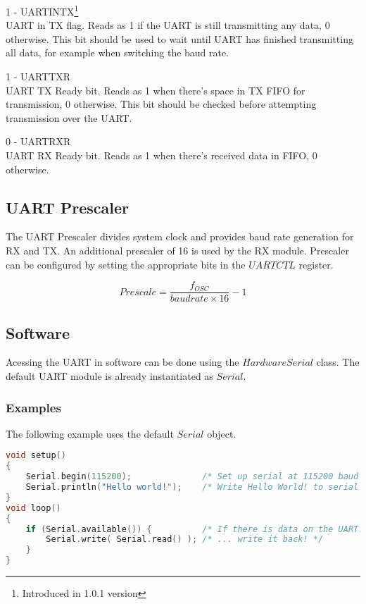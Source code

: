 \begin{description}
\item{1 - UARTINTX\footnote{Introduced in 1.0.1 version}} \hfill \\
UART in TX flag. Reads as 1 if the UART is still transmitting any data, 0 otherwise. This bit should be used to wait until
UART has finished transmitting all data, for example when switching the baud rate.
\item{1 - UARTTXR} \hfill \\
UART TX Ready bit. Reads as 1 when there's space in TX FIFO for transmission, 0 otherwise. This bit should be checked before 
attempting transmission over the UART.

\item{0 - UARTRXR} \hfill \\
UART RX Ready bit. Reads as 1 when there's received data in FIFO, 0 otherwise.

\end{description}



\subsection{UART Prescaler}\label{UART Prescaler}
The UART Prescaler divides system clock and provides baud rate generation for RX and TX. 
An additional prescaler of 16 is used by the RX module. Prescaler can be configured by
setting the appropriate bits in the $UARTCTL$ register.

\begin{displaymath}
Prescale = \frac{f_{OSC}}{baudrate \times 16} - 1
\end{displaymath}

\subsection{Software}
Acessing the UART in software can be done using the $HardwareSerial$ class. The default UART module is 
already instantiated as $Serial$.
\subsubsection{Examples}
The following example uses the default $Serial$ object.
\begin{lstlisting}[language=C++]
void setup()
{
    Serial.begin(115200);              /* Set up serial at 115200 baud */
    Serial.println("Hello world!");    /* Write Hello World! to serial */
}
void loop()
{
    if (Serial.available()) {          /* If there is data on the UART... */
        Serial.write( Serial.read() ); /* ... write it back! */
    }
}
\end{lstlisting}

